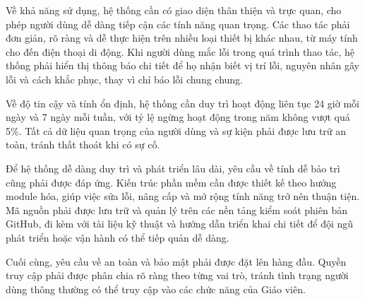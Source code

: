 Về khả năng sử dụng, hệ thống cần có giao diện thân thiện và trực quan, cho phép người dùng dễ dàng tiếp cận các tính năng quan trọng. Các thao tác phải đơn giản, rõ
ràng và dễ thực hiện trên nhiều loại thiết bị khác nhau, từ máy tính cho đến điện thoại di động. Khi người dùng mắc lỗi trong quá trình thao tác, hệ thống phải hiển thị thông báo chi tiết để họ nhận biết vị trí lỗi, nguyên nhân gây lỗi và cách khắc phục, thay vì chỉ báo lỗi chung chung.

Về độ tin cậy và tính ổn định, hệ thống cần duy trì hoạt động liên tục 24 giờ mỗi ngày và 7 ngày mỗi tuần, với tỷ lệ ngừng hoạt động trong năm không vượt quá 5\%. Tất cả dữ liệu quan trọng của người dùng và sự kiện phải được lưu trữ an toàn, tránh thất thoát khi có sự cố.

Để hệ thống dễ dàng duy trì và phát triển lâu dài, yêu cầu về tính dễ bảo trì cũng phải được đáp ứng. Kiến trúc phần mềm cần được thiết kế theo hướng module hóa, giúp việc sửa lỗi, nâng cấp và mở rộng tính năng trở nên thuận tiện. Mã nguồn phải được lưu trữ và quản lý trên các nền tảng kiểm soát phiên bản GitHub, đi kèm với tài liệu kỹ thuật và hướng dẫn triển khai chi tiết để đội ngũ phát triển hoặc vận hành có thể tiếp quản dễ dàng.

Cuối cùng, yêu cầu về an toàn và bảo mật phải được đặt lên hàng đầu. Quyền truy cập phải được phân chia rõ ràng theo từng vai trò, tránh tình trạng người dùng thông thường có
thể truy cập vào các chức năng của Giáo viên.